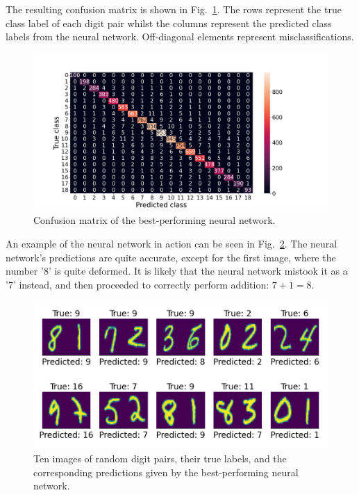 \documentclass[11pt,a4paper]{article}
\begin{document}
The resulting confusion matrix is shown in Fig.~\ref{fig:nn_confusion}. The rows represent the true class label of each digit pair whilst the columns represent the predicted class labels from the neural network. Off-diagonal elements represent misclassifications.

\begin{figure}[ht]
    \centering
    \includegraphics[width=\columnwidth, keepaspectratio]{../confusion_nn.png}
    \caption{Confusion matrix of the best-performing neural network. }\label{fig:nn_confusion}
\end{figure}

An example of the neural network in action can be seen in Fig.~\ref{fig:nn_predict}. The neural network's predictions are quite accurate, except for the first image, where the number '8' is quite deformed. It is likely that the neural network mistook it as a '7' instead, and then proceeded to correctly perform addition: $7+1=8$.

\begin{figure}[ht]
    \centering
    \includegraphics[width=\columnwidth, keepaspectratio]{../nn_predictions.png}
    \caption{Ten images of random digit pairs, their true labels, and the corresponding predictions given by the best-performing neural network.}\label{fig:nn_predict}
\end{figure}
\end{document}
